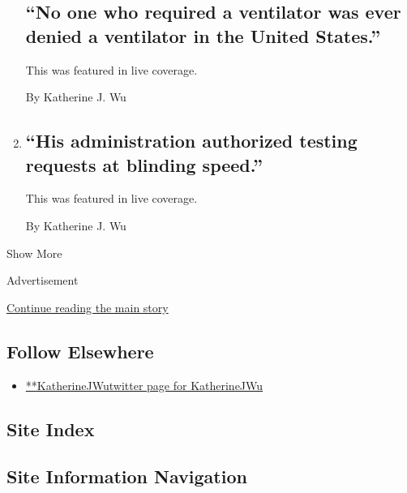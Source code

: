 \begin{enumerate}
  \hypertarget{no-one-who-required-a-ventilator-was-ever-denied-a-ventilator-in-the-united-states}{%
  \subsection{``No one who required a ventilator was ever denied a
  ventilator in the United
  States.''}\label{no-one-who-required-a-ventilator-was-ever-denied-a-ventilator-in-the-united-states}}

  This was featured in live coverage.

  By Katherine J. Wu
\item
  \href{/live/2020/08/26/us/rnc-fact-check/his-administration-authorized-testing-requests-at-blinding-speed}{}

  \hypertarget{his-administration-authorized-testing-requests-at-blinding-speed}{%
  \subsection{``His administration authorized testing requests at
  blinding
  speed.''}\label{his-administration-authorized-testing-requests-at-blinding-speed}}

  This was featured in live coverage.

  By Katherine J. Wu
\end{enumerate}

Show More

Advertisement

\protect\hyperlink{after-mid2}{Continue reading the main story}

\hypertarget{follow-elsewhere}{%
\subsection{Follow Elsewhere}\label{follow-elsewhere}}

\begin{itemize}
\tightlist
\item
  \href{https://twitter.com/KatherineJWu}{**KatherineJWutwitter page for
  KatherineJWu}
\end{itemize}

\hypertarget{site-index}{%
\subsection{Site Index}\label{site-index}}

\hypertarget{site-information-navigation}{%
\subsection{Site Information
Navigation}\label{site-information-navigation}}

